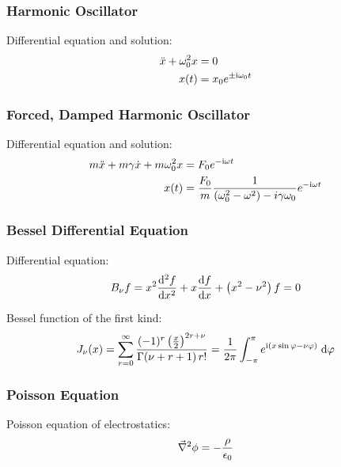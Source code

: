 		\subsubsection{Harmonic Oscillator}
			\noindent
			Differential equation and solution:
			\begin{equation}
				\begin{aligned}
					\ddot{x}+\omega_0^2 x &= 0 \\
					x(t) &= x_0 e^{\pm \mathrm{i}\omega_0 t}
				\end{aligned}
			\end{equation}

		\subsubsection{Forced, Damped Harmonic Oscillator}
			\noindent
			Differential equation and solution:
			\begin{equation}
				\begin{aligned}
					m\ddot{x}+m\gamma\dot{x}+m\omega_0^2 x &= F_0 e^{-\mathrm{i}\omega t} \\
					x(t) &= \frac{F_0}{m} \frac{1}{\left(\omega_0^2-\omega^2\right)-i\gamma\omega_0} e^{-\mathrm{i}\omega t}
				\end{aligned}
			\end{equation}

		\subsubsection{Bessel Differential Equation}
			\noindent
			Differential equation:
			\begin{equation}
				B_\nu f = x^2\frac{\mathrm{d}^2 f}{\mathrm{d} x^2} + x\frac{\mathrm{d} f}{\mathrm{d} x}+\left(x^2-\nu^2\right)f = 0
			\end{equation}

			\noindent
			Bessel function of the first kind:
			\begin{equation}
				J_\nu(x) = \sum_{r=0}^\infty \frac{(-1)^r\left(\frac{x}{2}\right)^{2r+\nu}}{\Gamma(\nu+r+1)\,r!} = \frac{1}{2\pi}\int_{-\pi}^{\pi} 	e^{\mathrm{i}(x\sin\varphi-\nu\varphi)}\;\mathrm{d}\varphi
			\end{equation}

		\subsubsection{Poisson Equation}
			\noindent
			Poisson equation of electrostatics:
			\begin{equation}
				\vec{\nabla}^2\phi = -\frac{\rho}{\epsilon_0}
			\end{equation}

